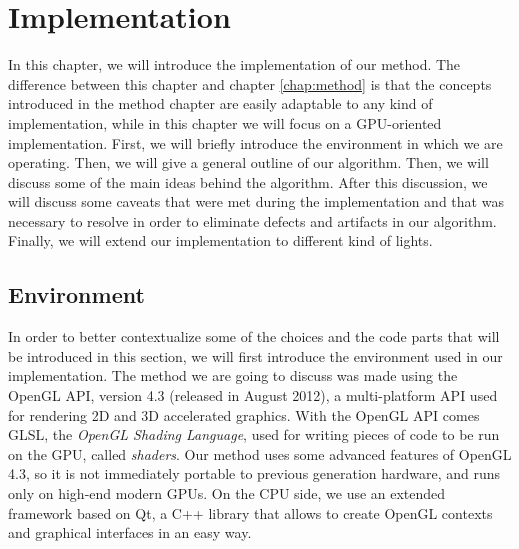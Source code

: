 \chapter{Implementation}
\label{chap:implementation}
In this chapter, we will introduce the implementation of our method. The difference between this chapter and chapter \ref{chap:method} is that the concepts introduced in the method chapter are easily adaptable to any kind of implementation, while in this chapter we will focus on a GPU-oriented implementation. First, we will briefly introduce the environment in which we are operating. Then, we will give a general outline of our algorithm. Then, we will discuss some of the main ideas behind the algorithm. After this discussion, we will discuss some caveats that were met during the implementation and that was necessary to resolve in order to eliminate defects and artifacts in our algorithm. Finally, we will extend our implementation to different kind of lights. %

\section{Environment}

In order to better contextualize some of the choices and the code parts that will be introduced in this section, we will first introduce the environment used in our implementation. The method we are going to discuss was made using the OpenGL API, version 4.3 (released in August 2012), a multi-platform API used for rendering 2D and 3D accelerated graphics. With the OpenGL API comes GLSL, the \emph{OpenGL Shading Language}, used for writing pieces of code to be run on the GPU, called \emph{shaders}. Our method uses some advanced features of OpenGL 4.3, so it is not immediately portable to previous generation hardware, and runs only on high-end modern GPUs. On the CPU side, we use an extended framework based on Qt, a C++ library that allows to create OpenGL contexts and graphical interfaces in an easy way.


